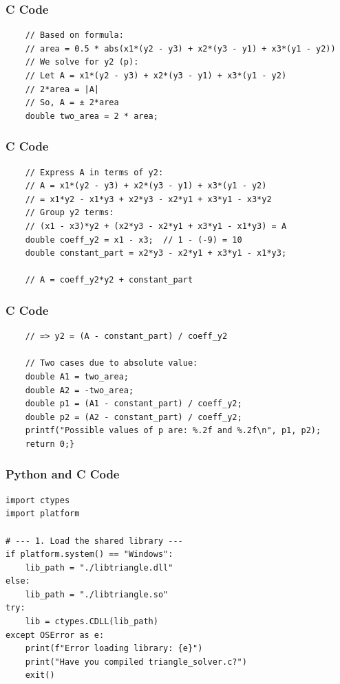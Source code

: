 \documentclass{beamer}
\begin{document}
\begin{frame}[fragile]
\frametitle{C Code}
\begin{lstlisting}
    // Based on formula:
    // area = 0.5 * abs(x1*(y2 - y3) + x2*(y3 - y1) + x3*(y1 - y2))
    // We solve for y2 (p):
    // Let A = x1*(y2 - y3) + x2*(y3 - y1) + x3*(y1 - y2)
    // 2*area = |A|
    // So, A = ± 2*area
    double two_area = 2 * area;
\end{lstlisting}
\end{frame}

\begin{frame}[fragile]
\frametitle{C Code}
\begin{lstlisting}
    // Express A in terms of y2:
    // A = x1*(y2 - y3) + x2*(y3 - y1) + x3*(y1 - y2)
    // = x1*y2 - x1*y3 + x2*y3 - x2*y1 + x3*y1 - x3*y2
    // Group y2 terms:
    // (x1 - x3)*y2 + (x2*y3 - x2*y1 + x3*y1 - x1*y3) = A
    double coeff_y2 = x1 - x3;  // 1 - (-9) = 10
    double constant_part = x2*y3 - x2*y1 + x3*y1 - x1*y3;

    // A = coeff_y2*y2 + constant_part
\end{lstlisting}
\end{frame}

\begin{frame}[fragile]
\frametitle{C Code}
\begin{lstlisting}
    // => y2 = (A - constant_part) / coeff_y2

    // Two cases due to absolute value:
    double A1 = two_area;
    double A2 = -two_area;
    double p1 = (A1 - constant_part) / coeff_y2;
    double p2 = (A2 - constant_part) / coeff_y2;
    printf("Possible values of p are: %.2f and %.2f\n", p1, p2);
    return 0;}

\end{lstlisting}
\end{frame}

\begin{frame}[fragile]
\frametitle{Python and C Code}

\begin{lstlisting}
import ctypes
import platform

# --- 1. Load the shared library ---
if platform.system() == "Windows":
    lib_path = "./libtriangle.dll"
else:
    lib_path = "./libtriangle.so"
try:
    lib = ctypes.CDLL(lib_path)
except OSError as e:
    print(f"Error loading library: {e}")
    print("Have you compiled triangle_solver.c?")
    exit()
\end{lstlisting}
\end{frame}
\end{document}
